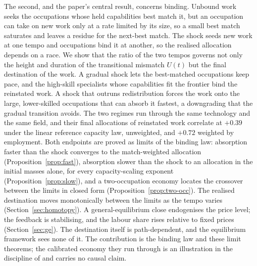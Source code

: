 \documentclass[12pt, a4paper]{article}
\begin{document}
The second, and the paper's central result, concerns binding. Unbound
work seeks the occupations whose held capabilities best match it, but
an occupation can take on new work only at a rate limited by its size,
so a small best match saturates and leaves a residue for the next-best
match. The shock seeds new work at one tempo and occupations bind it at
another, so the realised allocation depends on a race. We show that the
ratio of the two tempos governs not only the height and duration of the
transitional mismatch $U(t)$ but the final destination of the work. A
gradual shock lets the best-matched occupations keep pace, and the
high-skill specialists whose capabilities fit the frontier bind the
reinstated work. A shock that outruns redistribution forces the work
onto the large, lower-skilled occupations that can absorb it fastest, a
downgrading that the gradual transition avoids. The two regimes run
through the same technology and the same field, and their final
allocations of reinstated work correlate at $+0.39$ under the linear
reference capacity law, unweighted, and $+0.72$ weighted by employment. Both endpoints are
proved as limits of the binding law: absorption faster than the shock
converges to the match-weighted allocation
(Proposition~\ref{prop:fast}), absorption slower than the shock to an
allocation in the initial masses alone, for every capacity-scaling
exponent (Proposition~\ref{prop:slow}), and a two-occupation economy
locates the crossover between the limits in closed form
(Proposition~\ref{prop:two-occ}). The realised destination moves
monotonically between the limits as the tempo varies
(Section~\ref{sec:homotopy}). A general-equilibrium close endogenises
the price level; the feedback is stabilising, and the labour share
rises relative to fixed prices (Section~\ref{sec:ge}). The destination
itself is path-dependent, and the equilibrium framework sees none of
it. The contribution is the binding law and these limit theorems; the
calibrated economy they run through is an illustration in the
discipline of \textcite{storck2026fields} and carries no causal claim.
\end{document}
